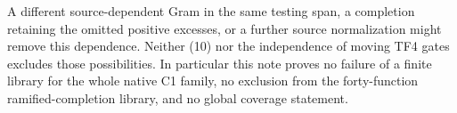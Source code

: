 \documentclass[11pt]{article}
\begin{document}
A different source-dependent Gram in the same testing span, a
completion retaining the omitted positive excesses, or a further
source normalization might remove this dependence. Neither (10)
nor the independence of moving TF4 gates excludes those possibilities.
In particular this note proves no failure of a finite library for the
whole native C1 family, no exclusion from the forty-function
ramified-completion library, and no global coverage statement.
\end{document}
